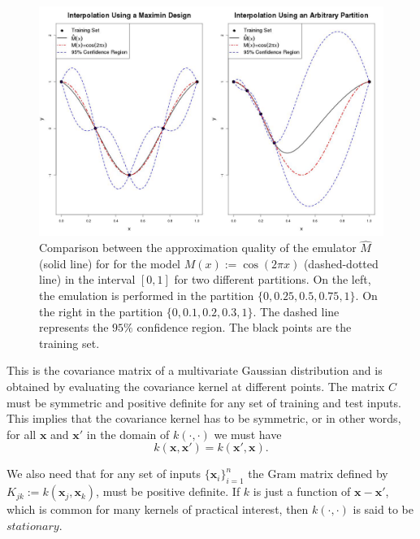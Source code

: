 \documentclass[12pt]{book}
\newcommand{\x}{\textbf{x}}
\begin{document}
\begin{figure}[H]
\raggedleft
\includegraphics[scale=0.33]{./FigChap2/partitionComparison}
\caption{Comparison between the approximation quality of the emulator $\widehat{M}$ (solid line) for 
for the model $M(x):=\cos(2\pi x)$ (dashed-dotted line) in the interval $[0,1]$ for two different partitions. 
On the left, the emulation is performed in the partition $\{0,0.25,0.5,0.75,1\}$. On
the right in the partition $\{0,0.1,0.2,0.3,1\}$. The dashed line represents the $95\%$ confidence region. The
black points are the training set.}
\label{figChp2}
\end{figure}
This is the covariance matrix of a multivariate Gaussian distribution and is obtained by evaluating
the covariance kernel at different points. The matrix $C$ must be  symmetric and  positive definite 
for any set of training and test inputs. This implies that the covariance kernel has to be symmetric,
or in other words, for all $\x$ and $\x'$ in the domain of $k(\cdot,\cdot)$ we must have
\begin{equation*}
k(\x,\x')=k(\x',\x).
\end{equation*}


We also need that for  any set of inputs $\{\x_{i}\}_{i=1}^{n}$  the Gram  matrix defined by 
$K_{jk}:=k(\x_{j},\x_{k})$, must be positive definite. If  $k$ is just a function of $\x-\x'$,
which is common for many kernels of practical interest, then $k(\cdot,\cdot)$ is said to be $\textit{stationary}$.
\end{document}
